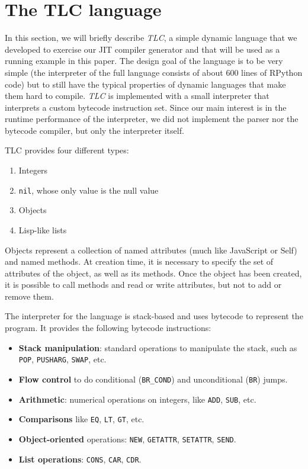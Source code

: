 \section{The TLC language}

In this section, we will briefly describe \emph{TLC}, a simple dynamic
language that we developed to exercise our JIT compiler generator and that will
be used as a running example in this paper. The design goal of the language is
to be very simple (the interpreter of the full language consists of about 600
lines of RPython code) but to still have the typical properties of dynamic
languages that make them hard to compile. \emph{TLC} is implemented with a small
interpreter that interprets a custom bytecode instruction set. Since our main
interest is in the runtime performance of the interpreter, we did not implement
the parser nor the bytecode compiler, but only the interpreter itself.

TLC provides four different types:
\begin{enumerate}
\item Integers
\item \lstinline{nil}, whose only value is the null value
\item Objects
\item Lisp-like lists
\end{enumerate}

Objects represent a collection of named attributes (much like JavaScript or
Self) and named methods.  At creation time, it is necessary to specify the set
of attributes of the object, as well as its methods.  Once the object has been
created, it is possible to call methods and read or write attributes, but not
to add or remove them.

The interpreter for the language is stack-based and uses bytecode to represent
the program. It provides the following bytecode instructions:

\begin{itemize}
\item \textbf{Stack manipulation}: standard operations to manipulate the
  stack, such as \lstinline{POP}, \lstinline{PUSHARG}, \lstinline{SWAP}, etc.
\item \textbf{Flow control} to do conditional (\lstinline{BR_COND}) and
  unconditional (\lstinline{BR}) jumps.
\item \textbf{Arithmetic}: numerical operations on integers, like
  \lstinline{ADD}, \lstinline{SUB}, etc.
\item \textbf{Comparisons} like \lstinline{EQ}, \lstinline{LT},
  \lstinline{GT}, etc.
\item \textbf{Object-oriented} operations: \lstinline{NEW},
  \lstinline{GETATTR}, \lstinline{SETATTR}, \lstinline{SEND}.
\item \textbf{List operations}: \lstinline{CONS}, \lstinline{CAR},
  \lstinline{CDR}.
\end{itemize}

